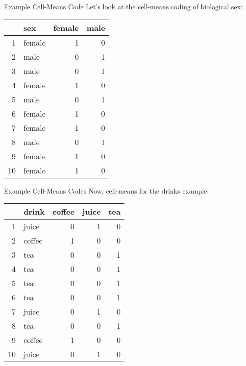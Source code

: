 \documentclass{beamer}\usepackage[]{graphicx}\usepackage[]{color}
\begin{document}

\begin{frame}{Example Cell-Means Code} 
 Let's look at the cell-means coding of biological sex: 
\begin{table}[ht]
\centering
\begin{tabular}{rlrr}
  \toprule
 & sex & female & male \\ 
  \midrule
1 & female & 1 & 0 \\ 
  2 & male & 0 & 1 \\ 
  3 & male & 0 & 1 \\ 
  4 & female & 1 & 0 \\ 
  5 & male & 0 & 1 \\ 
  6 & female & 1 & 0 \\ 
  7 & female & 1 & 0 \\ 
  8 & male & 0 & 1 \\ 
  9 & female & 1 & 0 \\ 
  10 & female & 1 & 0 \\ 
   \bottomrule
\end{tabular}
\end{table}


\end{frame}


\begin{frame}{Example Cell-Means Codes} 
 Now, cell-means for the drinks example: 
\begin{table}[ht]
\centering
\begin{tabular}{rlrrr}
  \toprule
 & drink & coffee & juice & tea \\ 
  \midrule
1 & juice & 0 & 1 & 0 \\ 
  2 & coffee & 1 & 0 & 0 \\ 
  3 & tea & 0 & 0 & 1 \\ 
  4 & tea & 0 & 0 & 1 \\ 
  5 & tea & 0 & 0 & 1 \\ 
  6 & tea & 0 & 0 & 1 \\ 
  7 & juice & 0 & 1 & 0 \\ 
  8 & tea & 0 & 0 & 1 \\ 
  9 & coffee & 1 & 0 & 0 \\ 
  10 & juice & 0 & 1 & 0 \\ 
   \bottomrule
\end{tabular}
\end{table}


\end{frame}
\end{document}
